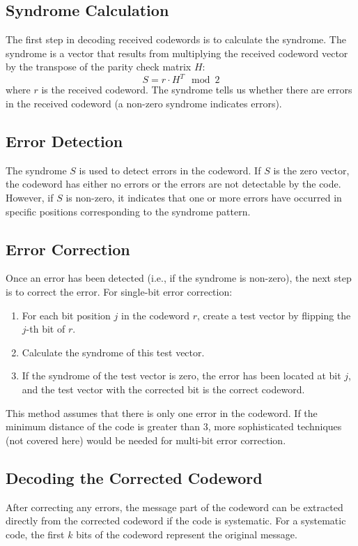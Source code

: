 \documentclass{article}
\begin{document}
\subsection{Syndrome Calculation}
The first step in decoding received codewords is to calculate the syndrome. The syndrome is a vector that results from multiplying the received codeword vector by the transpose of the parity check matrix $H$:
\[
S = r \cdot H^T \mod 2
\]
where $r$ is the received codeword. The syndrome tells us whether there are errors in the received codeword (a non-zero syndrome indicates errors).

\subsection{Error Detection}
The syndrome $S$ is used to detect errors in the codeword. If $S$ is the zero vector, the codeword has either no errors or the errors are not detectable by the code. However, if $S$ is non-zero, it indicates that one or more errors have occurred in specific positions corresponding to the syndrome pattern.

\subsection{Error Correction}
Once an error has been detected (i.e., if the syndrome is non-zero), the next step is to correct the error. For single-bit error correction:
\begin{enumerate}
    \item For each bit position $j$ in the codeword $r$, create a test vector by flipping the $j$-th bit of $r$.
    \item Calculate the syndrome of this test vector.
    \item If the syndrome of the test vector is zero, the error has been located at bit $j$, and the test vector with the corrected bit is the correct codeword.
\end{enumerate}
This method assumes that there is only one error in the codeword. If the minimum distance of the code is greater than 3, more sophisticated techniques (not covered here) would be needed for multi-bit error correction.

\subsection{Decoding the Corrected Codeword}
After correcting any errors, the message part of the codeword can be extracted directly from the corrected codeword if the code is systematic. For a systematic code, the first $k$ bits of the codeword represent the original message.
\end{document}
